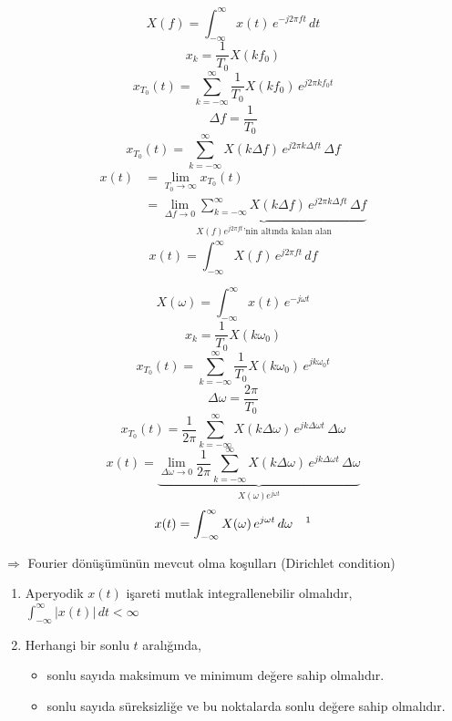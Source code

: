 \documentclass[11pt,a4paper]{article}
\begin{document}
\noindent
\begin{minipage}[t]{0.47\linewidth}
\[ X(f)=\int_{-\infty}^{\infty} x(t)\,e^{-j2\pi ft}\,dt \]
\[ x_k=\frac{1}{T_0}X(kf_0) \]
\[ x_{T_0}(t)=\sum_{k=-\infty}^{\infty}\frac{1}{T_0}X(kf_0)\,e^{j2\pi kf_0t} \]
\[ \Delta f=\frac{1}{T_0} \]
\[ x_{T_0}(t)=\sum_{k=-\infty}^{\infty} X(k\Delta f)\,e^{j2\pi k\Delta ft}\,\Delta f \]
\begin{align*}
x(t) &= \lim_{T_0\to\infty} x_{T_0}(t)\\
&= \underbrace{\lim_{\Delta f\to0}\sum_{k=-\infty}^{\infty} X(k\Delta f)\,e^{j2\pi k\Delta ft}\,\Delta f}_{X(f)e^{j2\pi ft}\text{'nin altında kalan alan}}
\end{align*}
\[ x(t)=\int_{-\infty}^{\infty} X(f)\,e^{j2\pi ft}\,df \]
\end{minipage}\hfill
\begin{minipage}[t]{0.06\linewidth}
\vspace{18mm}\centering
{\color{kirmizikalem}}
\end{minipage}\hfill
\begin{minipage}[t]{0.44\linewidth}
\[ X(\omega)=\int_{-\infty}^{\infty} x(t)\,e^{-j\omega t} \]
\[ x_k=\frac{1}{T_0}X(k\omega_0) \]
\[ x_{T_0}(t)=\sum_{k=-\infty}^{\infty}\frac{1}{T_0}X(k\omega_0)\,e^{jk\omega_0t} \]
\[ \Delta\omega=\frac{2\pi}{T_0} \]
\[ x_{T_0}(t)=\frac{1}{2\pi}\sum_{k=-\infty}^{\infty} X(k\Delta\omega)\,e^{jk\Delta\omega t}\,\Delta\omega \]
\[ x(t)=\underbrace{\lim_{\Delta\omega\to0}\frac{1}{2\pi}\sum_{k=-\infty}^{\infty} X(k\Delta\omega)\,e^{jk\Delta\omega t}\,\Delta\omega}_{X(\omega)e^{j\omega t}} \]
\[ x(t)=\int_{-\infty}^{\infty} X(\omega)\,e^{j\omega t}\,d\omega\quad\text{\footnotemark} \]
\end{minipage}

\medskip
$\Rightarrow$ Fourier dönüşümünün mevcut olma koşulları (Dirichlet condition)
\begin{enumerate}[label=\arabic*)]
\item Aperyodik $x(t)$ işareti mutlak integrallenebilir olmalıdır, \ $\displaystyle\int_{-\infty}^{\infty} |x(t)|\,dt<\infty$
\item Herhangi bir sonlu $t$ aralığında,
  \begin{itemize}[label=--]
  \item sonlu sayıda maksimum ve minimum değere sahip olmalıdır.
  \item sonlu sayıda süreksizliğe ve bu noktalarda sonlu değere sahip olmalıdır.
  \end{itemize}
\end{enumerate}
\end{document}
